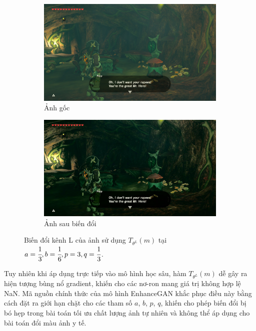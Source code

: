 \documentclass[12pt]{extreport}
\begin{document}
\begin{figure}[H]
    \centering
    \begin{subfigure}[H]{0.45\textwidth}
        \centering
        \includegraphics[width=\linewidth]{enhancegan/image.jpg}
        \caption{Ảnh gốc}
    \end{subfigure}
    \begin{subfigure}[H]{0.45\textwidth}
        \centering
        \includegraphics[width=\linewidth]{enhancegan/transformed.jpg}
        \caption{Ảnh sau biến đổi}
    \end{subfigure}
    \caption{Biến đổi kênh L của ảnh sử dụng $ T_{\theta^L}(m) $ tại $ a = \cfrac{1}{3}, b = \cfrac{1}{6}, p = 3, q = \cfrac{1}{3} $.}
\end{figure}

Tuy nhiên khi áp dụng trực tiếp vào mô hình học sâu, hàm $ T_{\theta^L}(m) $ dễ gây ra hiện tượng bùng nổ gradient, khiến cho các nơ-ron mang giá trị không hợp lệ NaN. Mã nguồn chính thức của mô hình EnhanceGAN khắc phục điều này bằng cách đặt ra giới hạn chặt cho các tham số $ a $, $ b $, $ p $, $ q $, khiến cho phép biến đổi bị bó hẹp trong bài toán tối ưu chất lượng ảnh tự nhiên và không thể áp dụng cho bài toán đổi màu ảnh y tế.
\end{document}
